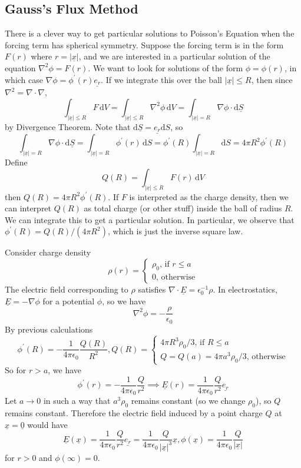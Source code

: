 \subsection{Gauss's Flux Method}
There is a clever way to get particular solutions to Poisson's Equation when the forcing term has spherical symmetry.
Suppose the forcing term is in the form $F(r)$ where $r=|\underline{x}|$, and we are interested in a particular solution of the equation $\nabla^2\phi=F(r)$.
We want to look for solutions of the form $\phi=\phi(r)$, in which case $\nabla\phi=\phi^\prime(r)\underline{e_r}$.
If we integrate this over the ball $|\underline{x}|\le R$, then since $\nabla^2=\nabla\cdot\nabla$,
$$\int_{|\underline{x}|\le R}F\,\mathrm dV=\int_{|\underline{x}|\le R}\nabla^2\phi\,\mathrm dV=\int_{|\underline{x}|=R}\nabla\phi\cdot\mathrm d\underline{S}$$
by Divergence Theorem.
Note that $\mathrm d\underline{S}=\underline{e_r}\mathrm dS$, so
$$\int_{|\underline{x}|=R}\nabla\phi\cdot\mathrm d\underline{S}=\int_{|\underline{x}|=R}\phi^\prime(r)\,\mathrm dS=\phi^\prime(R)\int_{|\underline{x}|=R}\mathrm dS=4\pi R^2\phi^\prime(R)$$
Define
$$Q(R)=\int_{|\underline{x}|\le R}F(r)\,\mathrm dV$$
then $Q(R)=4\pi R^2\phi^\prime(R)$.
If $F$ is interpreted as the charge density, then we can interpret $Q(R)$ as total charge (or other stuff) inside the ball of radius $R$.
We can integrate this to get a particular solution.
In particular, we observe that $\phi^\prime(R)=Q(R)/(4\pi R^2)$, which is just the inverse square law.
\begin{example}
    Consider charge density
    $$\rho(r)=\begin{cases}
        \rho_0\text{, if $r\le a$}\\
        0\text{, otherwise}
    \end{cases}$$
    The electric field corresponding to $\rho$ satisfies $\nabla\cdot\underline{E}=\epsilon_0^{-1}\rho$.
    In electrostatics, $\underline{E}=-\nabla\phi$ for a potential $\phi$, so we have
    $$\nabla^2\phi=-\frac{\rho}{\epsilon_0}$$
    By previous calculations
    $$\phi^\prime(R)=-\frac{1}{4\pi\epsilon_0}\frac{Q(R)}{R^2},Q(R)=\begin{cases}
        4\pi R^3\rho_0/3\text{, if $R\le a$}\\
        Q=Q(a)=4\pi a^3\rho_0/3\text{, otherwise}
    \end{cases}$$
    So for $r>a$, we have
    $$\phi^\prime(r)=-\frac{1}{4\pi\epsilon_0}\frac{Q}{r^2}\implies\underline{E}(r)=\frac{1}{4\pi\epsilon_0}\frac{Q}{r^2}\underline{e_r}$$
    Let $a\to 0$ in such a way that $a^3\rho_0$ remains constant (so we change $\rho_0$), so $Q$ remains constant.
    Therefore the electric field induced by a point charge $Q$ at $\underline{x}=\underline{0}$ would have
    $$\underline{E}(\underline{x})=\frac{1}{4\pi\epsilon_0}\frac{Q}{r^2}\underline{e_r}=\frac{1}{4\pi\epsilon_0}\frac{Q}{|\underline{x}|^3}\underline{x},\phi(\underline{x})=\frac{1}{4\pi\epsilon_0}\frac{Q}{|\underline{x}|}$$
    for $r>0$ and $\phi(\infty)=0$.
\end{example}
